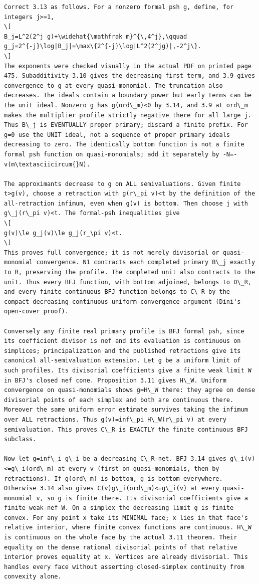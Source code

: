 \documentclass[
]{article}
\begin{document}
\begin{verbatim}
Correct 3.13 as follows. For a nonzero formal psh g, define, for integers j>=1,
\[
B_j=L^2(2^j g)+\widehat{\mathfrak m}^{\,4^j},\qquad
g_j=2^{-j}\log|B_j|=\max\{2^{-j}\log|L^2(2^jg)|,-2^j\}.
\]
The exponents were checked visually in the actual PDF on printed page 475. Subadditivity 3.10 gives the decreasing first term, and 3.9 gives convergence to g at every quasi-monomial. The truncation also decreases. The ideals contain a boundary power but early terms can be the unit ideal. Nonzero g has g(ord\_m)<0 by 3.14, and 3.9 at ord\_m makes the multiplier profile strictly negative there for all large j. Thus B\_j is EVENTUALLY proper primary; discard a finite prefix. For g=0 use the UNIT ideal, not a sequence of proper primary ideals decreasing to zero. The identically bottom function is not a finite formal psh function on quasi-monomials; add it separately by -N=-v(m\textasciicircum{}N).

The approximants decrease to g on ALL semivaluations. Given finite t>g(v), choose a retraction with g(r\_pi v)<t by the definition of the all-retraction infimum, even when g(v) is bottom. Then choose j with g\_j(r\_pi v)<t. The formal-psh inequalities give
\[
g(v)\le g_j(v)\le g_j(r_\pi v)<t.
\]
This proves full convergence; it is not merely divisorial or quasi-monomial convergence. N1 contracts each completed primary B\_j exactly to R, preserving the profile. The completed unit also contracts to the unit. Thus every BFJ function, with bottom adjoined, belongs to D\_R, and every finite continuous BFJ function belongs to C\_R by the compact decreasing-continuous uniform-convergence argument (Dini's open-cover proof).

Conversely any finite real primary profile is BFJ formal psh, since its coefficient divisor is nef and its evaluation is continuous on simplices; principalization and the published retractions give its canonical all-semivaluation extension. Let g be a uniform limit of such profiles. Its divisorial coefficients give a finite weak limit W in BFJ's closed nef cone. Proposition 3.11 gives H\_W. Uniform convergence on quasi-monomials shows g=H\_W there: they agree on dense divisorial points of each simplex and both are continuous there. Moreover the same uniform error estimate survives taking the infimum over ALL retractions. Thus g(v)=inf\_pi H\_W(r\_pi v) at every semivaluation. This proves C\_R is EXACTLY the finite continuous BFJ subclass.

Now let g=inf\_i g\_i be a decreasing C\_R-net. BFJ 3.14 gives g\_i(v)<=g\_i(ord\_m) at every v (first on quasi-monomials, then by retractions). If g(ord\_m) is bottom, g is bottom everywhere. Otherwise 3.14 also gives C(v)g\_i(ord\_m)<=g\_i(v) at every quasi-monomial v, so g is finite there. Its divisorial coefficients give a finite weak-nef W. On a simplex the decreasing limit g is finite convex. For any point x take its MINIMAL face; x lies in that face's relative interior, where finite convex functions are continuous. H\_W is continuous on the whole face by the actual 3.11 theorem. Their equality on the dense rational divisorial points of that relative interior proves equality at x. Vertices are already divisorial. This handles every face without asserting closed-simplex continuity from convexity alone.


\end{verbatim}
\end{document}

